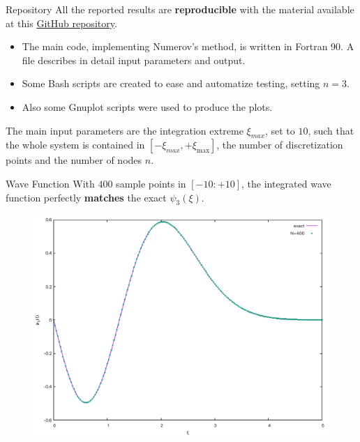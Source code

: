 \documentclass{beamer}
\begin{document}
\begin{frame}{Repository}
All the reported results are \textbf{reproducible} with the material available at this \href{https://github.com/andreamecchina/Numerovs_Method_Quantum_Harmonic_Oscillator}{\color{blue}GitHub repository}.\\
\vspace{0.5em}
\begin{itemize}
\item The main code, implementing Numerov's method, is written in Fortran 90. A  file describes in detail input parameters and output.
\vspace{0.5em}
\item Some Bash scripts are created to ease and automatize testing, setting $n=3$.
\vspace{0.5em}
\item Also some Gnuplot scripts were used to produce the plots.\\
\end{itemize}
\vspace{0.5em}
The main input parameters are the integration extreme $\xi_{max}$, set to $10$, such that the whole system is contained in $[-\xi_{max},+\xi_{\max}]$, the number of discretization points and the number of nodes $n$.
\end{frame}

\begin{frame}{Wave Function}
With $400$ sample points in $[-10:+10]$, the integrated wave function perfectly \textbf{matches} the exact $\psi_3(\xi)$.
\begin{figure}
\centering
\includegraphics[width=0.75\linewidth]{../gnuplot/imageA.pdf}
\end{figure}
\end{frame}
\end{document}
